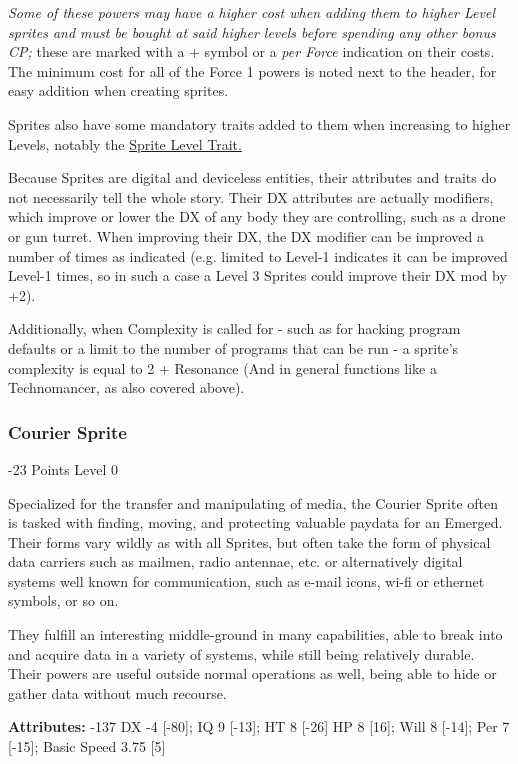 \begin{multicols*}{3}
\textit{Some of these powers may have a higher cost when adding them to higher Level sprites and must be bought at said higher levels before spending any other bonus CP;} these are marked with a + symbol or a \textit{per Force} indication on their costs. The minimum cost for all of the Force 1 powers is noted next to the header, for easy addition when creating sprites.

Sprites also have some mandatory traits added to them when increasing to higher Levels, notably the \hyperref[sprite_level]{Sprite Level Trait.}

Because Sprites are digital and deviceless entities, their attributes and traits do not necessarily tell the whole story. Their DX attributes are actually modifiers, which improve or lower the DX of any body they are controlling, such as a drone or gun turret. When improving their DX, the DX modifier can be improved a number of times as indicated (e.g. limited to Level-1 indicates it can be improved Level-1 times, so in such a case a Level 3 Sprites could improve their DX mod by +2).

Additionally, when Complexity is called for - such as for hacking program defaults or a limit to the number of programs that can be run - a sprite's complexity is equal to 2 + Resonance (And in general functions like a Technomancer, as also covered above).

\subsubsection{Courier Sprite}
\begin{flushright}
	 -23 Points Level 0
\end{flushright}

Specialized for the transfer and manipulating of media, the Courier Sprite often is tasked with finding, moving, and protecting valuable paydata for an Emerged. Their forms vary wildly as with all Sprites, but often take the form of physical data carriers such as mailmen, radio antennae, etc. or alternatively digital systems well known for communication, such as e-mail icons, wi-fi or ethernet symbols, or so on.

They fulfill an interesting middle-ground in many capabilities, able to break into and acquire data in a variety of systems, while still being relatively durable. Their powers are useful outside normal operations as well, being able to hide or gather data without much recourse.

\textbf{Attributes:} -137
DX -4 [-80]; IQ 9 [-13]; HT 8 [-26]
HP 8 [16]; Will 8 [-14]; Per 7 [-15]; Basic Speed 3.75 [5]


\end{multicols*}
